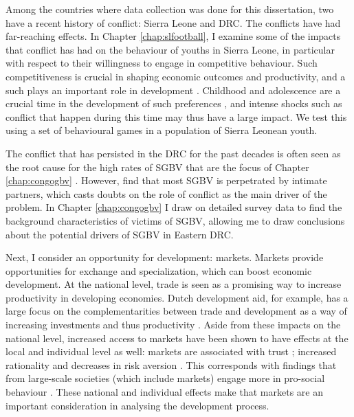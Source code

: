 Among the countries where data collection was done for this dissertation, two have a recent history of conflict: Sierra Leone and DRC. The conflicts have had far-reaching effects. In Chapter \ref{chap:slfootball}, I examine some of the impacts that conflict has had on the behaviour of youths in Sierra Leone, in particular with respect to their willingness to engage in competitive behaviour. Such competitiveness is crucial in shaping economic outcomes and productivity, and a such plays an important role in development \citep{Niederle2007}. Childhood and adolescence are a crucial time in the development of such preferences \citep{Benenson2007,Fehr2008,Sutter2007a}, and intense shocks such as conflict that happen during this time may thus have a large impact. We test this using a set of behavioural games in a population of Sierra Leonean youth.

The conflict that has persisted in the DRC for the past decades is often seen as the root cause for the high rates of SGBV that are the focus of Chapter \ref{chap:congogbv} \citep{Baaz2013,Kirby2015,Johnson2010}. However, \cite{Peterman2011} find that most SGBV is perpetrated by intimate partners, which casts doubts on the role of conflict as the main driver of the problem. In Chapter \ref{chap:congogbv} I draw on detailed survey data to find the background characteristics of victims of SGBV, allowing me to draw conclusions about the potential drivers of SGBV in Eastern DRC.

Next, I consider an opportunity for development: markets. Markets provide opportunities for exchange and specialization, which can boost economic development. At the national level, trade is seen as a promising way to increase productivity in developing economies. Dutch development aid, for example, has a large focus on the complementarities between trade and development as a way of increasing investments and thus productivity \citep[see e.g.][]{Zoomers2014}. Aside from these impacts on the national level, increased access to markets have been shown to have effects at the local and individual level as well: markets are associated with trust \citep{Tu2010,Fischer2008}; increased rationality \citep{List2008,Cecchi2013,Braga2009} and decreases in risk aversion \citep{Melesse2015}. This corresponds with findings that from large-scale societies (which include markets) engage more in pro-social behaviour \cite{Henrich2005,Henrich2010}. These national and individual effects make that markets are an important consideration in analysing the development process. 

